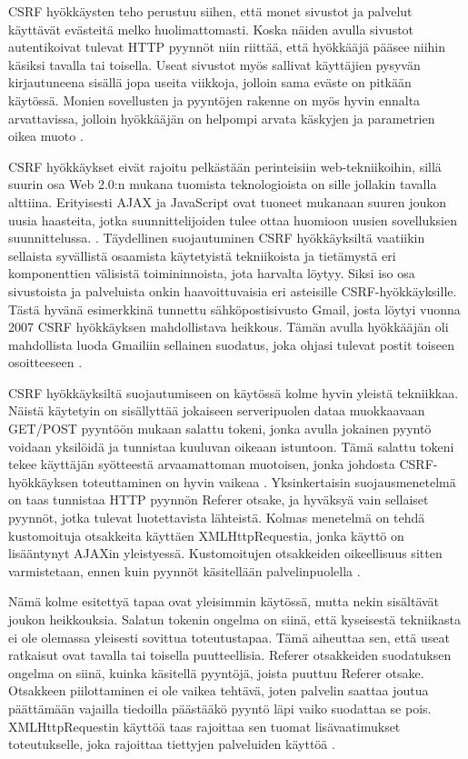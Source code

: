 CSRF hyökkäysten teho perustuu siihen, että monet sivustot ja palvelut käyttävät evästeitä melko huolimattomasti. Koska näiden avulla sivustot autentikoivat tulevat 
HTTP pyynnöt niin riittää, että hyökkääjä pääsee niihin käsiksi tavalla tai toisella. Useat sivustot myös sallivat käyttäjien pysyvän kirjautuneena sisällä
jopa useita viikkoja, jolloin sama eväste on pitkään käytössä. Monien sovellusten ja pyyntöjen rakenne on myös hyvin ennalta arvattavissa, jolloin hyökkääjän
on helpompi arvata käskyjen ja parametrien oikea muoto \cite{WEB2}.

CSRF hyökkäykset eivät rajoitu pelkästään perinteisiin web-tekniikoihin, sillä suurin osa Web 2.0:n mukana tuomista teknologioista on sille jollakin 
tavalla alttiina. Erityisesti AJAX ja JavaScript ovat tuoneet mukanaan suuren joukon uusia haasteita, jotka suunnittelijoiden tulee ottaa huomioon uusien
sovelluksien suunnittelussa. \cite{WEB2b}. Täydellinen suojautuminen CSRF hyökkäyksiltä vaatiikin sellaista syvällistä osaamista käytetyistä tekniikoista ja 
tietämystä eri komponenttien välisistä toimininnoista, jota harvalta löytyy. Siksi iso osa sivustoista ja palveluista onkin haavoittuvaisia eri asteisille
CSRF-hyökkäyksille. Tästä hyvänä esimerkkinä tunnettu sähköpostisivusto Gmail, josta löytyi vuonna 2007 CSRF hyökkäyksen mahdollistava heikkous. Tämän avulla
hyökkääjän oli mahdollista luoda Gmailiin sellainen suodatus, joka ohjasi tulevat postit toiseen osoitteeseen \cite{CSRF}. 

CSRF hyökkäyksiltä suojautumiseen on käytössä kolme hyvin yleistä tekniikkaa. Näistä käytetyin on sisällyttää jokaiseen serveripuolen dataa muokkaavaan
GET/POST pyyntöön mukaan salattu tokeni, jonka avulla jokainen pyyntö voidaan yksilöidä ja tunnistaa kuuluvan oikeaan istuntoon. Tämä salattu tokeni tekee
käyttäjän syötteestä arvaamattoman muotoisen, jonka johdosta CSRF-hyökkäyksen toteuttaminen on hyvin vaikeaa \cite{WEB2}. Yksinkertaisin suojausmenetelmä on 
taas tunnistaa HTTP pyynnön Referer otsake, ja hyväksyä vain sellaiset pyynnöt, jotka tulevat luotettavista lähteistä. Kolmas menetelmä on tehdä kustomoituja
otsakkeita käyttäen XMLHttpRequestia, jonka käyttö on lisääntynyt AJAXin yleistyessä. Kustomoitujen otsakkeiden oikeellisuus sitten varmistetaan, ennen kuin
pyynnöt käsitellään palvelinpuolella \cite{CSRF}.

Nämä kolme esitettyä tapaa ovat yleisimmin käytössä, mutta nekin sisältävät joukon heikkouksia. Salatun tokenin ongelma on siinä, että kyseisestä tekniikasta ei 
ole olemassa yleisesti sovittua toteutustapaa. Tämä aiheuttaa sen, että useat ratkaisut ovat tavalla tai toisella puutteellisia. Referer otsakkeiden suodatuksen 
ongelma on siinä, kuinka käsitellä pyyntöjä, joista puuttuu Referer otsake. Otsakkeen piilottaminen ei ole vaikea tehtävä, joten palvelin saattaa joutua 
päättämään vajailla tiedoilla päästääkö pyyntö läpi vaiko suodattaa se pois. XMLHttpRequestin käyttöä taas rajoittaa sen tuomat lisävaatimukset toteutukselle,
joka rajoittaa tiettyjen palveluiden käyttöä \cite{CSRF}. 

